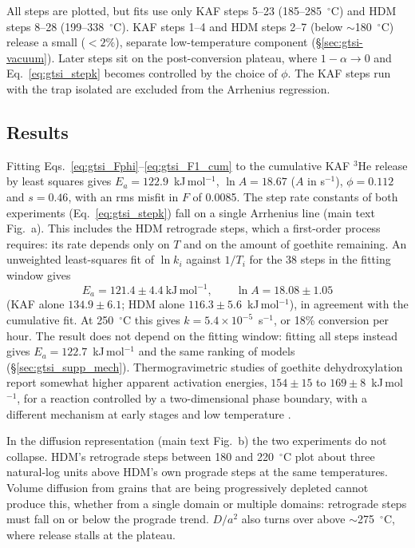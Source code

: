 All steps are plotted, but fits use only KAF steps 5--23
(185--285~$^\circ$C) and HDM steps 8--28 (199--338~$^\circ$C). KAF steps 1--4 and HDM steps 2--7
(below $\sim$180~$^\circ$C) release a small ($<2\%$), separate low-temperature component
(\S\ref{sec:gtsi-vacuum}). Later steps sit on the post-conversion plateau, where
$1-\alpha\to0$ and Eq.~\eqref{eq:gtsi_stepk} becomes controlled by the choice of $\phi$. The KAF
steps run with the trap isolated are excluded from the Arrhenius regression.

\subsection{Results}

Fitting Eqs.~\eqref{eq:gtsi_Fphi}--\eqref{eq:gtsi_F1_cum} to the cumulative KAF $^3$He
release by least squares gives $E_a = 122.9$~kJ\,mol$^{-1}$, $\ln A = 18.67$ ($A$ in s$^{-1}$),
$\phi = 0.112$ and $s = 0.46$, with an rms misfit in $F$ of 0.0085. The step rate constants of
both experiments (Eq.~\eqref{eq:gtsi_stepk}) fall on a single Arrhenius line
(main text Fig.~\MainFigGtArrhenius{}a). This includes the HDM retrograde steps, which a first-order
process requires: its rate depends only on $T$ and on the amount of goethite remaining. An
unweighted least-squares fit of $\ln k_i$ against $1/T_i$ for the 38 steps in the fitting window
gives
\begin{equation}
  E_a = 121.4 \pm 4.4~\mathrm{kJ\,mol^{-1}},
  \qquad
  \ln A = 18.08 \pm 1.05
  \label{eq:gtsi_line}
\end{equation}
(KAF alone $134.9\pm6.1$; HDM alone $116.3\pm5.6$~kJ\,mol$^{-1}$), in agreement with the
cumulative fit. At 250~$^\circ$C this gives $k = 5.4\times10^{-5}$~s$^{-1}$, or 18\% conversion
per hour. The result does not depend on the fitting window: fitting all steps instead gives
$E_a = 122.7$~kJ\,mol$^{-1}$ and the same ranking of models (\S\ref{sec:gtsi_supp_mech}).
Thermogravimetric studies of goethite dehydroxylation report somewhat higher apparent activation
energies, $154\pm15$ to $169\pm8$~kJ\,mol$^{-1}$, for a reaction controlled by a two-dimensional
phase boundary, with a different mechanism at early stages and low temperature \citep{goss1987}.

In the diffusion representation (main text Fig.~\MainFigGtArrhenius{}b) the two experiments do not
collapse. HDM's retrograde steps between 180 and 220~$^\circ$C plot about three natural-log units
above HDM's own prograde steps at the same temperatures. Volume diffusion from grains that are
being progressively depleted cannot produce this, whether from a single domain or multiple
domains: retrograde steps must fall on or below the prograde trend. $D/a^2$ also turns over
above $\sim$275~$^\circ$C, where release stalls at the plateau.

